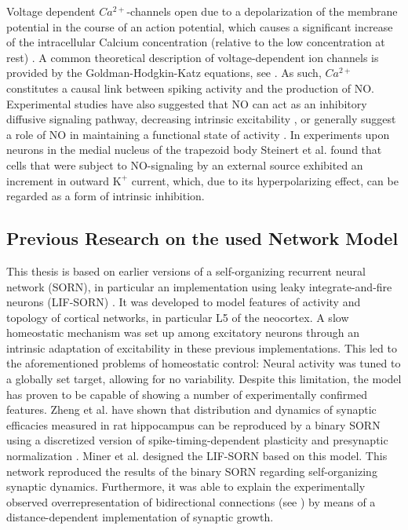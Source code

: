 \documentclass[10pt,a4paper]{article}
\begin{document}
Voltage dependent $Ca^{2+}$-channels open due to a depolarization of the membrane potential in the course of an action potential, which causes a significant increase of the intracellular Calcium concentration (relative to the low concentration at rest) \cite[p.~98-100]{Hille_Ion_Channels}. A common theoretical description of voltage-dependent ion channels is provided by the Goldman-Hodgkin-Katz equations, see \cite[p.~445-451]{Hille_Ion_Channels}. As such, $Ca^{2+}$ constitutes a causal link between spiking activity and the production of NO. Experimental studies have also suggested that NO can act as an inhibitory diffusive signaling pathway, decreasing intrinsic excitability \cite{Steinert_NO_2011}, or generally suggest a role of NO in maintaining a functional state of activity \cite{Pape_NO}. In experiments upon neurons in the medial nucleus of the trapezoid body Steinert et al. found that cells that were subject to NO-signaling by an external source exhibited an increment in outward $\mathrm{K^+}$ current, which, due to its hyperpolarizing effect, can be regarded as a form of intrinsic inhibition. 

\subsection{Previous Research on the used Network Model}
This thesis is based on earlier versions of a self-organizing recurrent neural network (SORN), in particular an implementation using leaky integrate-and-fire neurons (LIF-SORN) \cite{SORN_Paper}. It was developed to model features of activity and topology of cortical networks, in particular L5 of the neocortex. A slow homeostatic mechanism was set up among excitatory neurons through an intrinsic adaptation of excitability in these previous implementations. This led to the aforementioned problems of homeostatic control: Neural activity was tuned to a globally set target, allowing for no variability. Despite this limitation, the model has proven to be capable of showing a number of experimentally confirmed features. Zheng et al. have shown that distribution and dynamics of synaptic efficacies measured in rat hippocampus can be reproduced by a binary SORN using a discretized version of spike-timing-dependent plasticity and presynaptic normalization \cite{Pengsheng_2013}. Miner et al. designed the LIF-SORN based on this model. This network reproduced the results of the binary SORN regarding self-organizing synaptic dynamics. Furthermore, it was able to explain the experimentally observed overrepresentation of bidirectional connections (see \cite{Markram_Connections_1997,Song_Connectivity_2005}) by means of a distance-dependent implementation of synaptic growth.
\end{document}
